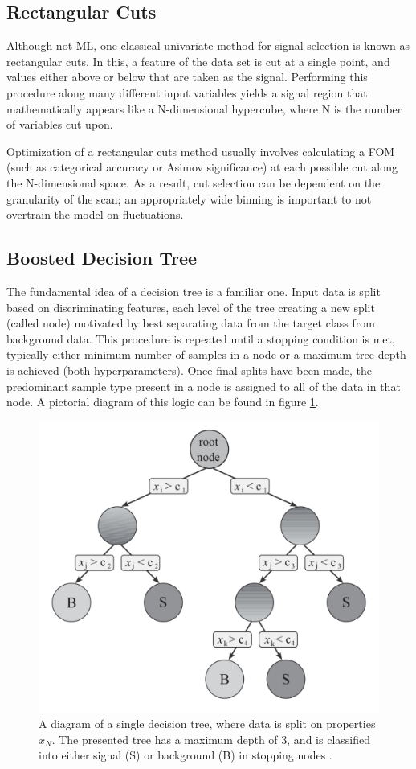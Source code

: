 \subsection{Rectangular Cuts}\label{ssec:rect-cuts}

Although not \gls{ML}, one classical univariate method for signal selection is known as rectangular cuts. In this, a feature of the data set is cut at a single point, and values either above or below that are taken as the signal. Performing this procedure along many different input variables yields a signal region that mathematically appears like a N-dimensional hypercube, where N is the number of variables cut upon. 

Optimization of a rectangular cuts method usually involves calculating a \gls{FOM} (such as categorical accuracy or Asimov significance) at each possible cut along the N-dimensional space. As a result, cut selection can be dependent on the granularity of the scan; an appropriately wide binning is important to not overtrain the model on fluctuations.

\subsection{Boosted Decision Tree}\label{ssec:bdt}

The fundamental idea of a decision tree is a familiar one. Input data is split based on discriminating features, each level of the tree creating a new split (called node) motivated by best separating data from the target class from background data. This procedure is repeated until a stopping condition is met, typically either minimum number of samples in a node or a maximum tree depth is achieved (both hyperparameters). Once final splits have been made, the predominant sample type present in a node is assigned to all of the data in that node. A pictorial diagram of this logic can be found in figure \ref{fig:bdt}.

\begin{figure}[!ht] 
    \centering
    \includegraphics[width=.7\textwidth]{appendices/images/bdt.png}
    \caption[A diagram of a single decision tree]{A diagram of a single decision tree, where data is split on properties $x_N$. The presented tree has a maximum depth of 3, and is classified into either signal (S) or background (B) in stopping nodes \cite{data-analysis}.}
    \label{fig:bdt}
\end{figure}

